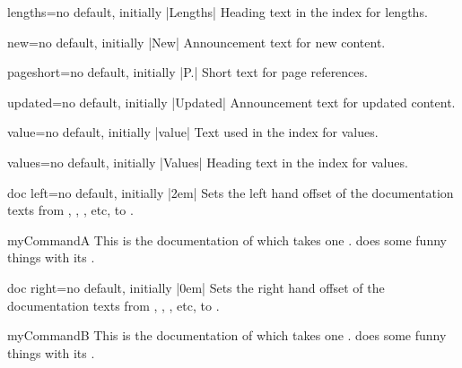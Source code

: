 \begin{langTcbKey}[][doc new={2015-01-08}]{lengths}{=}{no default, initially |Lengths|}
  Heading text in the index for lengths.
\end{langTcbKey}


\begin{langTcbKey}[][doc new={2014-09-19}]{new}{=}{no default, initially |New|}
  Announcement text for new content.
\end{langTcbKey}

\begin{langTcbKey}{pageshort}{=}{no default, initially |P.|}
  Short text for page references.
\end{langTcbKey}

\begin{langTcbKey}[][doc new={2014-09-19}]{updated}{=}{no default, initially |Updated|}
  Announcement text for updated content.
\end{langTcbKey}

\begin{langTcbKey}{value}{=}{no default, initially |value|}
  Text used in the index for values.
\end{langTcbKey}

\begin{langTcbKey}{values}{=}{no default, initially |Values|}
  Heading text in the index for values.
\end{langTcbKey}



\clearpage
\begin{docTcbKey}{doc left}{=}{no default, initially |2em|}
  Sets the left hand offset of the documentation texts from
  , , , etc, to .
\begin{dispExample}
\begin{docCommand*}[doc left=2cm,doc left indent=-2cm]{myCommandA}{}
  This is the documentation of  which takes one .
   does some funny things with its .
\end{docCommand*}
\end{dispExample}
\end{docTcbKey}

\begin{docTcbKey}{doc right}{=}{no default, initially |0em|}
  Sets the right hand offset of the documentation texts from
  , , , etc, to .
\begin{dispExample}
\begin{docCommand*}[doc right=2cm]{myCommandB}{}
  This is the documentation of  which takes one .
   does some funny things with its .
\end{docCommand*}
\end{dispExample}
\end{docTcbKey}


